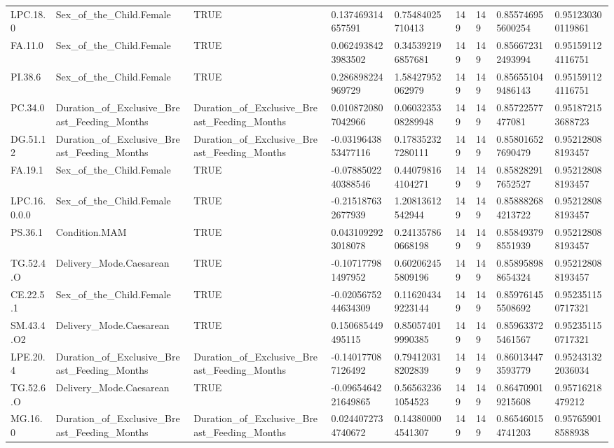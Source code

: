 \begin{longtable}{lllllllll}
LPC.18.0 & Sex\_of\_the\_Child.Female & TRUE & 0.137469314657591 & 0.75484025710413 & 149 & 149 & 0.855746955600254 & 0.951230300119861 \\
FA.11.0 & Sex\_of\_the\_Child.Female & TRUE & 0.0624938423983502 & 0.345392196857681 & 149 & 149 & 0.856672312493994 & 0.951591124116751 \\
PI.38.6 & Sex\_of\_the\_Child.Female & TRUE & 0.286898224969729 & 1.58427952062979 & 149 & 149 & 0.856551049486143 & 0.951591124116751 \\
PC.34.0 & Duration\_of\_Exclusive\_Breast\_Feeding\_Months & Duration\_of\_Exclusive\_Breast\_Feeding\_Months & 0.0108720807042966 & 0.0603235308289948 & 149 & 149 & 0.85722577477081 & 0.951872153688723 \\
DG.51.12 & Duration\_of\_Exclusive\_Breast\_Feeding\_Months & Duration\_of\_Exclusive\_Breast\_Feeding\_Months & -0.0319643853477116 & 0.178352327280111 & 149 & 149 & 0.858016527690479 & 0.952128088193457 \\
FA.19.1 & Sex\_of\_the\_Child.Female & TRUE & -0.0788502240388546 & 0.440798164104271 & 149 & 149 & 0.858282917652527 & 0.952128088193457 \\
LPC.16.0.0.0 & Sex\_of\_the\_Child.Female & TRUE & -0.215187632677939 & 1.20813612542944 & 149 & 149 & 0.858882684213722 & 0.952128088193457 \\
PS.36.1 & Condition.MAM & TRUE & 0.0431092923018078 & 0.241357860668198 & 149 & 149 & 0.858493798551939 & 0.952128088193457 \\
TG.52.4.O & Delivery\_Mode.Caesarean & TRUE & -0.107177981497952 & 0.602062455809196 & 149 & 149 & 0.858958988654324 & 0.952128088193457 \\
CE.22.5.1 & Sex\_of\_the\_Child.Female & TRUE & -0.0205675244634309 & 0.116204349223144 & 149 & 149 & 0.859761455508692 & 0.952351150717321 \\
SM.43.4.O2 & Delivery\_Mode.Caesarean & TRUE & 0.150685449495115 & 0.850574019990385 & 149 & 149 & 0.859633725461567 & 0.952351150717321 \\
LPE.20.4 & Duration\_of\_Exclusive\_Breast\_Feeding\_Months & Duration\_of\_Exclusive\_Breast\_Feeding\_Months & -0.140177087126492 & 0.794120318202839 & 149 & 149 & 0.860134473593779 & 0.952431322036034 \\
TG.52.6.O & Delivery\_Mode.Caesarean & TRUE & -0.0965464221649865 & 0.565632361054523 & 149 & 149 & 0.864709019215608 & 0.95716218479212 \\
MG.16.0 & Duration\_of\_Exclusive\_Breast\_Feeding\_Months & Duration\_of\_Exclusive\_Breast\_Feeding\_Months & 0.0244072734740672 & 0.143800004541307 & 149 & 149 & 0.865460154741203 & 0.957659018588938 \\

\end{longtable}
